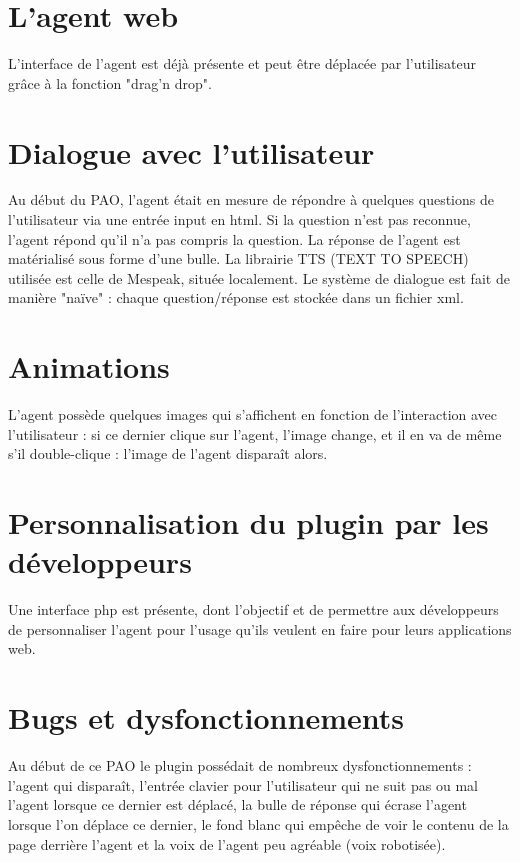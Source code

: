\documentclass[11pt,dvipsnames,svgnames]{report}
\begin{document}
	\section{L'agent web}
	
	L'interface de l'agent est déjà présente et peut être déplacée par l'utilisateur grâce à la fonction "drag'n drop".
	
	 \section{Dialogue avec l'utilisateur}
	 
	 Au début du PAO, l'agent était en mesure de répondre à quelques questions de l'utilisateur via une entrée input en html. Si la question n'est pas reconnue, l'agent répond qu'il n'a pas compris la question. La réponse de l'agent est matérialisé sous forme d'une bulle. La librairie TTS (TEXT TO SPEECH) utilisée est celle de Mespeak, située localement. Le système de dialogue est fait de manière "naïve" : chaque question/réponse est stockée dans un fichier xml.
	 
	 \section{Animations}
	 
	 L'agent possède quelques images qui s'affichent en fonction de l’interaction avec l'utilisateur : si ce dernier clique sur l'agent, l'image change, et il en va de même s'il double-clique : l'image de l'agent disparaît alors.
	 
	 \section{Personnalisation du plugin par les développeurs}
	 
	 Une interface php est présente, dont l'objectif et de permettre aux développeurs de personnaliser l'agent pour l'usage qu'ils veulent en faire pour leurs applications web.
	 
	 \section{Bugs et dysfonctionnements}
	 
	 Au début de ce PAO le plugin possédait de nombreux dysfonctionnements : l'agent qui disparaît, l'entrée clavier pour l'utilisateur qui ne suit pas ou mal l'agent lorsque ce dernier est déplacé, la bulle de réponse qui écrase l'agent lorsque l'on déplace ce dernier, le fond blanc qui empêche de voir le contenu de la page derrière l'agent et la voix de l'agent peu agréable (voix robotisée).\\
	 
\end{document}
